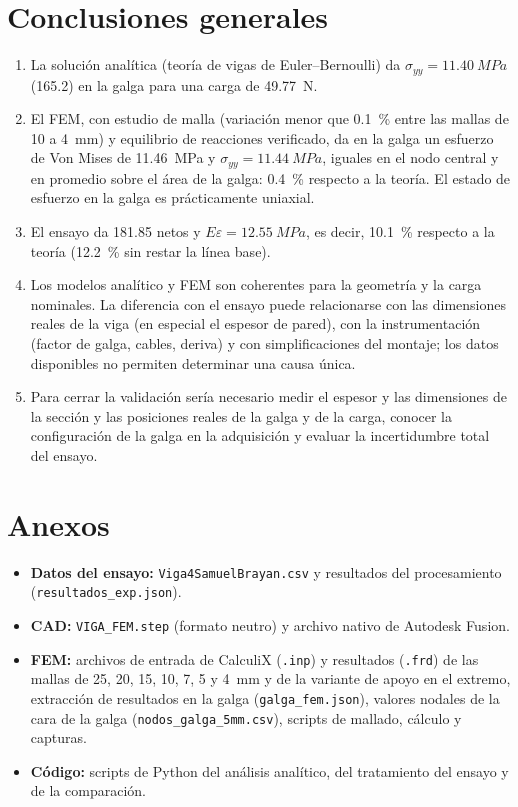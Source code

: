 \documentclass[11pt,a4paper]{article}
\begin{document}
\section{Conclusiones generales}
\begin{enumerate}
\item La soluci\'on anal\'itica (teor\'ia de vigas de Euler--Bernoulli) da $\sigma_{yy}=\SI{11,40}{MPa}$ (\SI{165,2}{\microstrain}) en la galga para una carga de \SI{49,77}{N}.
\item El FEM, con estudio de malla (variaci\'on menor que \SI{0,1}{\percent} entre las mallas de 10 a \SI{4}{mm}) y equilibrio de reacciones verificado, da en la galga un esfuerzo de Von Mises de \SI{11,46}{MPa} y $\sigma_{yy}=\SI{11,44}{MPa}$, iguales en el nodo central y en promedio sobre el \'area de la galga: \SI{+0,4}{\percent} respecto a la teor\'ia. El estado de esfuerzo en la galga es pr\'acticamente uniaxial.
\item El ensayo da \SI{181,85}{\microstrain} netos y $E\varepsilon=\SI{12,55}{MPa}$, es decir, \SI{+10,1}{\percent} respecto a la teor\'ia (\SI{+12,2}{\percent} sin restar la l\'inea base).
\item Los modelos anal\'itico y FEM son coherentes para la geometr\'ia y la carga nominales. La diferencia con el ensayo puede relacionarse con las dimensiones reales de la viga (en especial el espesor de pared), con la instrumentaci\'on (factor de galga, cables, deriva) y con simplificaciones del montaje; los datos disponibles no permiten determinar una causa \'unica.
\item Para cerrar la validaci\'on ser\'ia necesario medir el espesor y las dimensiones de la secci\'on y las posiciones reales de la galga y de la carga, conocer la configuraci\'on de la galga en la adquisici\'on y evaluar la incertidumbre total del ensayo.
\end{enumerate}

\section{Anexos}
\begin{itemize}
\item \textbf{Datos del ensayo:} \texttt{Viga4SamuelBrayan.csv} y resultados del procesamiento (\texttt{resultados\_exp.json}).
\item \textbf{CAD:} \texttt{VIGA\_FEM.step} (formato neutro) y archivo nativo de Autodesk Fusion.
\item \textbf{FEM:} archivos de entrada de CalculiX (\texttt{.inp}) y resultados (\texttt{.frd}) de las mallas de 25, 20, 15, 10, 7, 5 y \SI{4}{mm} y de la variante de apoyo en el extremo, extracci\'on de resultados en la galga (\texttt{galga\_fem.json}), valores nodales de la cara de la galga (\texttt{nodos\_galga\_5mm.csv}), scripts de mallado, c\'alculo y capturas.
\item \textbf{C\'odigo:} scripts de Python del an\'alisis anal\'itico, del tratamiento del ensayo y de la comparaci\'on.
\end{itemize}
\end{document}
